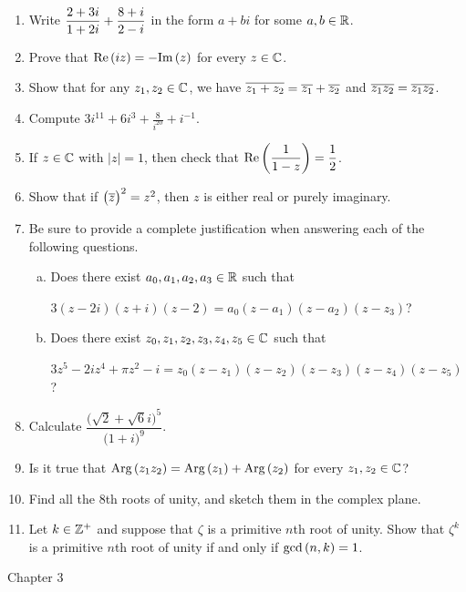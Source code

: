 \documentclass[11pt,fleqn,dvipsnames,usenames]{article}
\begin{document}
\begin{enumerate}
\item Write $\displaystyle{\frac{2 + 3i}{1 + 2i} + \frac{8+i}{2-i}}$ in the form $a+bi$ for some $a,b\in\mathbb{R}$.
\item Prove that $\text{Re}\left(iz\right) = -\text{Im}\left(z\right)$ for every $z\in\mathbb{C}$.
\item Show that for any $z_{1},z_{2}\in\mathbb{C}$, we have $\overline{z_{1} + z_{2}} = \overline{z_{1}} + \overline{z_{2}}$ and $\overline{z_{1}z_{2}} = \overline{z_{1}}\overline{z_{2}}$.
\item Compute $3i^{11} + 6i^{3} + \frac{8}{i^{20}} + i^{-1}$.
\item If $z\in\mathbb{C}$ with $|z| = 1$, then check that $\text{Re}\left(\dfrac{1}{1-z}\right) = \dfrac{1}{2}$.
\item Show that if $\big(\overline{z}\big)^2 = z^2$, then $z$ is either real or purely imaginary.
\item Be sure to provide a complete justification when answering each of the following questions.
\begin{enumerate}[(a)]
\item Does there exist $a_{0},a_{1},a_{2},a_{3}\in \mathbb{R}$ such that
\begin{center}
$3(z-2i)(z+i)(z-2) = a_{0}(z-a_{1})(z - a_{2})(z - z_{3})$?
\end{center}
\item Does there exist $z_{0},z_{1},z_{2},z_{3},z_{4},z_{5}\in \mathbb{C}$ such that
\begin{center}
$3z^5 - 2iz^4 + \pi z^2 - i = z_{0}(z - z_{1})(z - z_{2})(z - z_{3})(z - z_{4})(z - z_{5})$?
\end{center}
\end{enumerate}
\item Calculate $\dfrac{\big(\sqrt{2} + \sqrt{6}i\big)^5}{\big(1+i\big)^9}$.
\item Is it true that $\text{Arg}\left(z_1z_2\right) = \text{Arg}\left(z_1\right) + \text{Arg}\left(z_2\right)$ for every $z_{1},z_{2}\in\mathbb{C}$?
\item Find all the $8$th roots of unity, and sketch them in the complex plane.
\item Let $k\in\mathbb{Z}^{+}$ and suppose that $\zeta$ is a primitive $n$th root of unity.  Show that $\zeta^{k}$ is a primitive $n$th root of unity if and only if $\text{gcd}\left(n,k\right) = 1$.
\end{enumerate}
\vsp

{\huge Chapter 3}
\vsp
\end{document}
